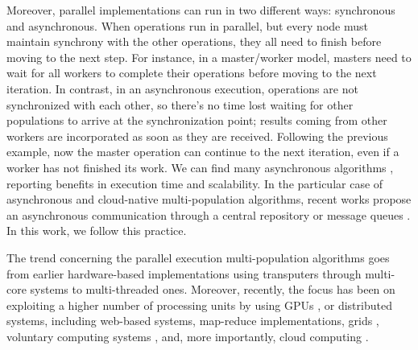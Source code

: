 \documentclass[review]{elsarticle}
\begin{document}
Moreover, parallel implementations can run in two different ways: synchronous and
asynchronous. When operations run in parallel, but every node must maintain synchrony with
the other operations, they all need to finish before moving to the next
step. For instance, in a  master/worker model, masters need to wait for all
workers to complete their operations before moving to the next iteration.  In
contrast, in an asynchronous execution,  operations are not synchronized with
each other, so there's no time lost waiting for other populations to
arrive at the synchronization point; results coming from other workers are 
incorporated as soon as they are received. Following the previous example, now the master operation can
continue to the next iteration, even if a worker has not finished its work.  We can find many asynchronous algorithms
\cite{coleman89,baugh2003asynchronous}, reporting benefits in execution time
and scalability. In the particular case of asynchronous and cloud-native
multi-population algorithms, recent works propose an asynchronous communication
through a central repository \cite{sofea:cec2012, JSON} or message queues
\cite{salza2019speed, guervos2018introducing}. In this work, we follow this
practice.

The trend concerning the parallel execution multi-population algorithms goes from
earlier hardware-based implementations using transputers
\cite{gorges1990explicit} through 
multi-core systems \cite{Serrano2008,lai2019adaptive} to multi-threaded \cite{merelo2019scaling} ones.
Moreover, recently, the focus has been on exploiting a higher number of processing
units by using GPUs \cite{tan2015survey,li2007efficient}, or distributed
systems, including web-based \cite{JSON} systems,
map-reduce \cite{fazenda2012} implementations,  grids \cite{munawar2010design,Gonzalez09},
voluntary computing systems \cite{MilkyWay,merelo2016nodio}, 
and, more importantly, cloud computing
\cite{GValdez2015,salza2019speed,valenzuela2015implementing,FlexGP}.
\end{document}
